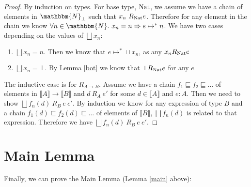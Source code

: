 \begin{proof}
By induction on types. For base type, $\operatorname{Nat}$, we assume we have a chain of elements in $\mathbbm{N}_\bot$ such that $x_n \ R_{\operatorname{Nat}} e$. Therefore for any element in the chain we know $\forall n \in \mathbbm{N} . \ x_n = n \Rightarrow e \mapsto^* n$. We have two cases depending on the values of $\bigsqcup x_n$:

\begin{enumerate}
\item{$\bigsqcup x_n = n$. Then we know that $e \mapsto^* \sqcup x_n$, as any $x_n R_{\operatorname{Nat}} e$}
\item{$\bigsqcup x_n = \bot$. By Lemma \ref{bot} we know that $\bot R_{\operatorname{Nat}} e$ for any $e$}
\end{enumerate}

The inductive case is for $R_{A \to B}$. Assume we have a chain $f_1 \sqsubseteq f_2 \sqsubseteq \dots$ of elements in $\llbracket A \rrbracket \to \llbracket B \rrbracket$ and $d \ R_A \ e'$ for some $d \in \llbracket A \rrbracket$ and $e : A$. Then we need to show $\bigsqcup f_n (d) \ R_B \ e \ e'$. By induction we know for any expression of type $B$ and a chain  $f_1(d) \sqsubseteq f_2(d) \sqsubseteq \dots$ of elements of $\llbracket B \rrbracket$, $\bigsqcup f_n(d)$ is related to that expression. Therefore we have $\bigsqcup f_n(d) \ R_B \ e \ e'$.
\end{proof}

\section{Main Lemma}
Finally, we can prove the Main Lemma (Lemma \ref{main} above):




